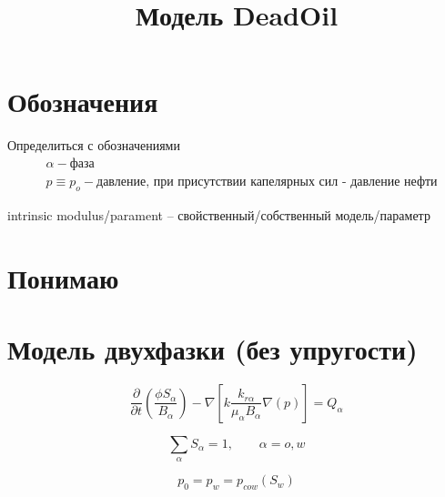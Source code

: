 \documentclass[14pt]{article}
\begin{document}
\title{Модель DeadOil}	
\maketitle

\section{Обозначения}
	Определиться с обозначениями
 	\begin{align*}
		& \alpha - \text{фаза}\\
		& p \equiv p_{o} - \text{давление, при присутствии капелярных сил - давление нефти} 
 	\end{align*}
 	
	intrinsic modulus/parament -- свойственный/собственный модель/параметр
\section{Понимаю} 


\section{Модель двухфазки (без упругости)}

	\begin{equation}
		\frac{\partial}{\partial t} \left( \frac{\phi S_{\alpha}}{B_{\alpha}} \right) - \nabla \left[ k \frac{k_{r \alpha}}{\mu_{\alpha} B_{\alpha}} \nabla \left( p \right) \right] = Q_{\alpha}
	\end{equation}
	
	\begin{equation}
		\sum_{\alpha} S_{\alpha} = 1, \qquad \alpha = o,w
	\end{equation}
	
	\begin{equation}
		p_{0} = p_{w} = p_{cow}(S_{w})
	\end{equation}
	
\end{document}

